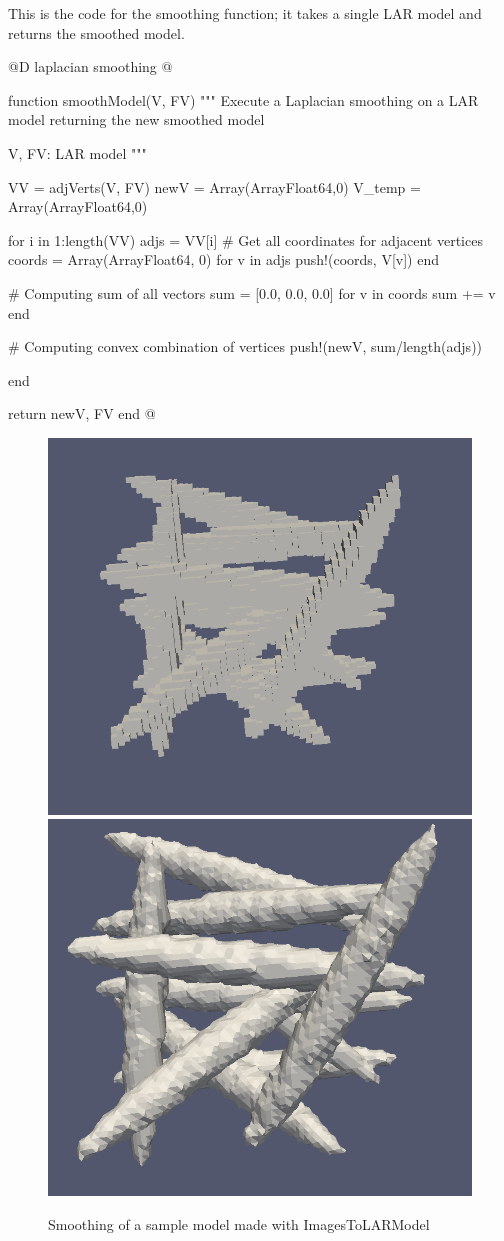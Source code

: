 \documentclass[11pt,oneside]{article}	%
\begin{document}
This is the code for the smoothing function; it takes a single LAR model and returns the smoothed model. 

@D laplacian smoothing
@{function smoothModel(V, FV)
  """
  Execute a Laplacian smoothing on a LAR model returning
  the new smoothed model

  V, FV: LAR model
  """

  VV = adjVerts(V, FV)
  newV = Array(Array{Float64},0)
  V_temp = Array(Array{Float64},0)

  for i in 1:length(VV)
    adjs = VV[i]
    # Get all coordinates for adjacent vertices
    coords = Array(Array{Float64}, 0)
    for v in adjs
      push!(coords, V[v])
    end

    # Computing sum of all vectors
    sum = [0.0, 0.0, 0.0]
    for v in coords
      sum += v
    end

    # Computing convex combination of vertices
    push!(newV, sum/length(adjs))

  end

  return newV, FV
end @}


\begin{figure}[htb] %
   \centering
   \includegraphics[width=0.40\linewidth]{images/ModelSmoothing0.png}
   \includegraphics[width=0.40\linewidth]{images/ModelSmoothing1.png}
   \caption{Smoothing of a sample model made with ImagesToLARModel}
   \label{fig:smoothingExample}
\end{figure}

\end{document}
